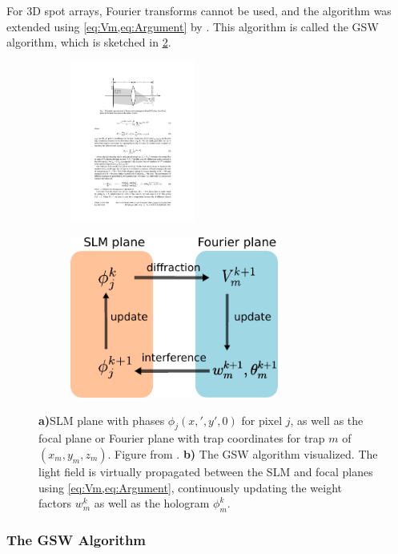 For 3D spot arrays, Fourier transforms cannot be used, and the algorithm was extended using \cref{eq:Vm,eq:Argument} by \cite{DiLeonardo2007}. 
This algorithm is called the \ac{GSW} algorithm, which is sketched in \cref{fig:GSWalgorithm}.

\begin{figure}
	\centering
	\begin{subfigure}{.56\textwidth}
		\centering
		\includegraphics[height=5.3cm]{figures/SLMgeometry.pdf}
		\caption{}
		\label{fig:SLMgeometry}
	\end{subfigure}
	\begin{subfigure}{.43\textwidth}
		\centering
		\includegraphics[height=5.3cm]{figures/WeightedGerschbergSaxton.pdf}
		\caption{}
		\label{fig:GSWalgorithm}
	\end{subfigure}
	\caption{\textsf{\textbf{a)}}SLM plane with phases $\phi_j(x,',y',0)$ for pixel $j$, as well as the focal plane or Fourier plane with trap coordinates for trap $m$ of $(x_m,y_m,z_m)$. 
		Figure from \cite{DiLeonardo2007}. 
		\textsf{\textbf{b)}} The \ac{GSW} algorithm visualized.
		The light field is virtually propagated between the SLM and focal planes using \cref{eq:Vm,eq:Argument}, continuously updating the weight factors $w_m^k$ as well as the hologram $\phi_m^k$.}
	\label{fig:GerschbergSaxton}
\end{figure}

\subsubsection*{The GSW Algorithm}

